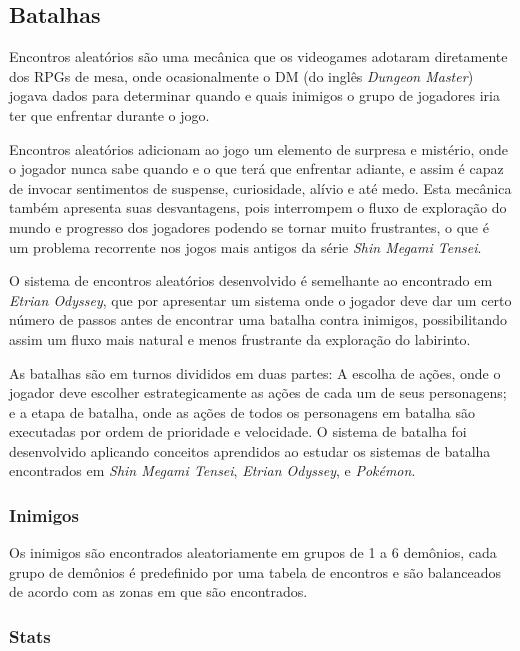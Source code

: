 \subsection{Batalhas}

Encontros aleatórios são uma mecânica que os videogames adotaram diretamente dos RPGs de mesa, onde ocasionalmente o DM (do inglês \emph{Dungeon Master}) jogava dados para determinar quando e quais inimigos o grupo de jogadores iria ter que enfrentar durante o jogo.

	Encontros aleatórios adicionam ao jogo um elemento de surpresa e mistério, onde o jogador nunca sabe quando e o que terá que enfrentar adiante, e assim é capaz de invocar sentimentos de suspense, curiosidade, alívio e até medo. Esta mecânica também apresenta suas desvantagens, pois interrompem o fluxo de exploração do mundo e progresso dos jogadores podendo se tornar muito frustrantes, o que é um problema recorrente nos jogos mais antigos da série \emph{Shin Megami Tensei}. 

	O sistema de encontros aleatórios desenvolvido é semelhante ao encontrado em \emph{Etrian Odyssey}, que por apresentar um sistema onde o jogador deve dar um certo número de passos antes de encontrar uma batalha contra inimigos, possibilitando assim um fluxo mais natural e menos frustrante da exploração do labirinto. 

	As batalhas são em turnos divididos em duas partes: A escolha de ações, onde o jogador deve escolher estrategicamente as ações de cada um de seus personagens; e a etapa de batalha, onde as ações de todos os personagens em batalha são executadas por ordem de prioridade e velocidade. O sistema de batalha foi desenvolvido aplicando conceitos aprendidos ao estudar os sistemas de batalha encontrados em \emph{Shin Megami Tensei}, \emph{Etrian Odyssey}, e \emph{Pokémon}.

\subsubsection{Inimigos}

Os inimigos são encontrados aleatoriamente em grupos de 1 a 6 demônios, cada grupo de demônios é predefinido por uma tabela de encontros e são balanceados de acordo com as zonas em que são encontrados.

\subsubsection{Stats}\label{info:stats}

